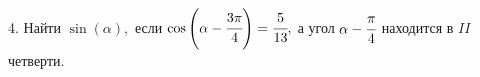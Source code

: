 4. Найти $\sin(\alpha),$ если $\cos\left(\alpha-\cfrac{3\pi}{4}\right)=\cfrac{5}{13},$ а угол $\alpha-\cfrac{\pi}{4}$ находится в $II$ четверти.\\
